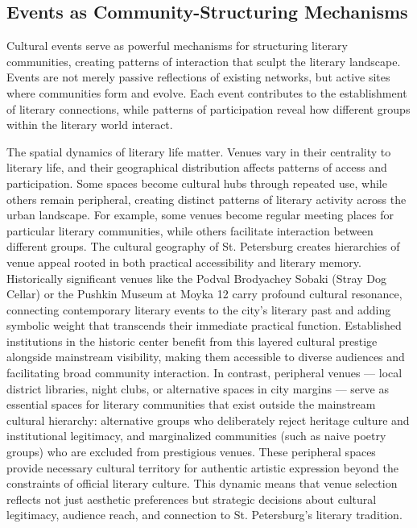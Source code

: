 \documentclass{jcls}
\begin{document}
\subsection{Events as Community-Structuring Mechanisms}

Cultural events serve as powerful mechanisms for structuring literary communities, creating patterns of interaction that sculpt the literary landscape. Events are not merely passive reflections of existing networks, but active sites where communities form and evolve. Each event contributes to the establishment of literary connections, while patterns of participation reveal how different groups within the literary world interact.

The spatial dynamics of literary life matter. Venues vary in their centrality to literary life, and their geographical distribution affects patterns of access and participation. Some spaces become cultural hubs through repeated use, while others remain peripheral, creating distinct patterns of literary activity across the urban landscape. For example, some venues become regular meeting places for particular literary communities, while others facilitate interaction between different groups. The cultural geography of St. Petersburg creates hierarchies of venue appeal rooted in both practical accessibility and literary memory. Historically significant venues like the Podval Brodyachey Sobaki (Stray Dog Cellar) or the Pushkin Museum at Moyka 12 carry profound cultural resonance, connecting contemporary literary events to the city's literary past and adding symbolic weight that transcends their immediate practical function. Established institutions in the historic center benefit from this layered cultural prestige alongside mainstream visibility, making them accessible to diverse audiences and facilitating broad community interaction. In contrast, peripheral venues — local district libraries, night clubs, or alternative spaces in city margins — serve as essential spaces for literary communities that exist outside the mainstream cultural hierarchy: alternative groups who deliberately reject heritage culture and institutional legitimacy, and marginalized communities (such as naive poetry groups) who are excluded from prestigious venues. These peripheral spaces provide necessary cultural territory for authentic artistic expression beyond the constraints of official literary culture. This dynamic means that venue selection reflects not just aesthetic preferences but strategic decisions about cultural legitimacy, audience reach, and connection to St. Petersburg's literary tradition.
\end{document}
